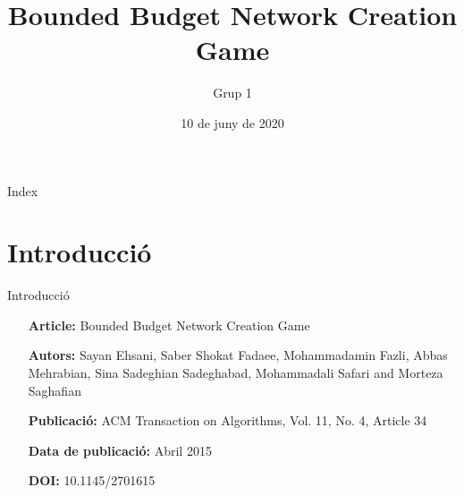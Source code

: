 \documentclass[aspectratio=169]{beamer}
\title[Bounded Budget Network Creation Game]{Bounded Budget Network Creation Game}
\subtitle{}
\author{Grup 1}
\institute{UPC - AA}
\date{10 de juny de 2020}
\begin{document}
\begin{frame}
  \titlepage
\end{frame}

\begin{frame}{Index}
  \tableofcontents
\end{frame}

\section{Introducció}

\begin{frame}{Introducció}
    \setlength{\leftmargini}{10em}
    \begin{itemize}
        \itemsep=1em
        \item[\textbf{Article:}] Bounded Budget Network Creation Game
        \item[\textbf{Autors:}] Sayan Ehsani, Saber Shokat Fadaee, Mohammadamin Fazli, Abbas Mehrabian, Sina Sadeghian Sadeghabad, Mohammadali Safari and Morteza Saghafian
        \item[\textbf{Publicació:}] ACM Transaction on Algorithms, Vol. 11, No. 4, Article 34
        \item[\textbf{Data de publicació:}] Abril 2015
        \item[\textbf{DOI:}] 10.1145/2701615
    \end{itemize}
\end{frame}
\end{document}
